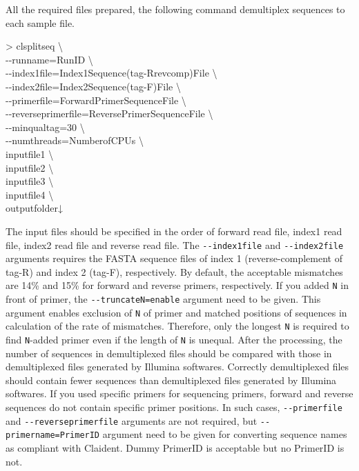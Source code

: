 \documentclass[titlepage,10pt,a4paper,english]{jsbook}
\newenvironment{cmd}{\begin{oframed}\raggedright\ttfamily\footnotesize\setlength{\baselineskip}{1.4em}}{\end{oframed}\vspace{-1em}}
\begin{document}
All the required files prepared, the following command demultiplex sequences to each sample file.

\begin{cmd}
{\textgreater} clsplitseq {\textbackslash}\\
{-}{-}runname=RunID {\textbackslash}\\
{-}{-}index1file=Index1Sequence(tag-Rrevcomp)File {\textbackslash}\\
{-}{-}index2file=Index2Sequence(tag-F)File {\textbackslash}\\
{-}{-}primerfile=ForwardPrimerSequenceFile {\textbackslash}\\
{-}{-}reverseprimerfile=ReversePrimerSequenceFile {\textbackslash}\\
{-}{-}minqualtag=30 {\textbackslash}\\
{-}{-}numthreads=NumberofCPUs {\textbackslash}\\
inputfile1 {\textbackslash}\\
inputfile2 {\textbackslash}\\
inputfile3 {\textbackslash}\\
inputfile4 {\textbackslash}\\
outputfolder↓
\end{cmd}

The input files should be specified in the order of forward read file, index1 read file, index2 read file and reverse read file.
The \texttt{{-}{-}index1file} and \texttt{{-}{-}index2file} arguments requires the FASTA sequence files of index 1 (reverse-complement of tag-R) and index 2 (tag-F), respectively.
By default, the acceptable mismatches are 14\% and 15\% for forward and reverse primers, respectively.
If you added \texttt{N} in front of primer, the \texttt{{-}{-}truncateN=enable} argument need to be given.
This argument enables exclusion of \texttt{N} of primer and matched positions of sequences in calculation of the rate of mismatches.
Therefore, only the longest \texttt{N} is required to find \texttt{N}-added primer even if the length of \texttt{N} is unequal.
After the processing, the number of sequences in demultiplexed files should be compared with those in demultiplexed files generated by Illumina softwares.
Correctly demultiplexed files should contain fewer sequences than demultiplexed files generated by Illumina softwares.
If you used specific primers for sequencing primers, forward and reverse sequences do not contain specific primer positions.
In such cases, \texttt{{-}{-}primerfile} and \texttt{{-}{-}reverseprimerfile} arguments are not required, but \texttt{{-}{-}primername=PrimerID} argument need to be given for converting sequence names as compliant with Claident.
Dummy PrimerID is acceptable but no PrimerID is not.
\end{document}
